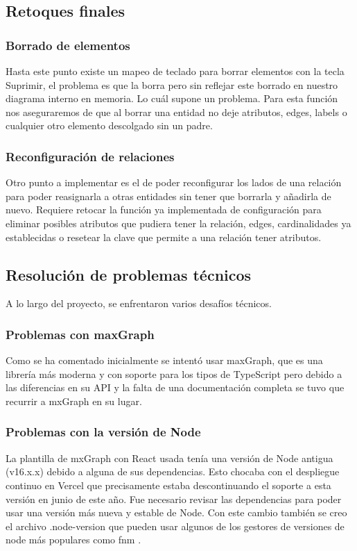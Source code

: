 \subsection{Retoques finales}
\subsubsection{Borrado de elementos}
Hasta este punto existe un mapeo de teclado para borrar elementos con la tecla Suprimir, el problema es que la borra pero sin reflejar este borrado en nuestro diagrama interno en memoria. Lo cuál supone un problema.
Para esta función nos aseguraremos de que al borrar una entidad no deje atributos, edges, labels o cualquier otro elemento descolgado sin un padre.
\subsubsection{Reconfiguración de relaciones}
Otro punto a implementar es el de poder reconfigurar los lados de una relación para poder reasignarla a otras entidades sin tener que borrarla y añadirla de nuevo.
Requiere retocar la función ya implementada de configuración para eliminar posibles atributos que pudiera tener la relación, edges, cardinalidades ya establecidas o resetear la clave que permite a una relación tener atributos.

\subsection{Resolución de problemas técnicos}
A lo largo del proyecto, se enfrentaron varios desafíos técnicos.

\subsubsection{Problemas con maxGraph}
Como se ha comentado inicialmente se intentó usar maxGraph, que es una librería más moderna y con soporte para los tipos de TypeScript \cite{typescript} pero debido a las diferencias en su API y la falta de una documentación completa se tuvo que recurrir a mxGraph en su lugar.

\subsubsection{Problemas con la versión de Node}
La plantilla de mxGraph con React usada tenía una versión de Node antigua (v16.x.x) debido a alguna de sus dependencias. Esto chocaba con el despliegue continuo en Vercel que precisamente estaba descontinuando el soporte a esta versión en junio de este año.
Fue necesario revisar las dependencias para poder usar una versión más nueva y estable de Node. Con este cambio también se creo el archivo .node-version que pueden usar algunos de los gestores de versiones de node más populares como fnm \cite{fnm}.

